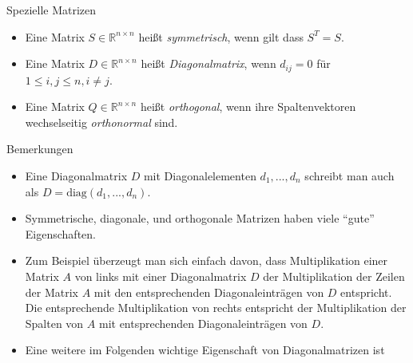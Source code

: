 \documentclass[
  8pt,
  ignorenonframetext,
]{beamer}
\begin{document}
\begin{frame}{Spezielle Matrizen}
\protect\hypertarget{spezielle-matrizen-1}{}
\footnotesize
\begin{definition}
\begin{itemize}
\item Eine Matrix $S \in \mathbb{R}^{n \times n}$ heißt \textit{symmetrisch}, wenn gilt dass $S^T = S$.
\item Eine Matrix $D \in \mathbb{R}^{n \times n}$ heißt \textit{Diagonalmatrix}, wenn $d_{ij} = 0$ für $1 \le i,j \le n, i \neq j$.
\item Eine Matrix $Q \in \mathbb{R}^{n \times n}$ heißt \textit{orthogonal}, wenn ihre Spaltenvektoren wechselseitig \textit{orthonormal} sind.
\end{itemize}
\end{definition}

Bemerkungen

\begin{itemize}
\justifying
\item Eine Diagonalmatrix $D$ mit Diagonalelementen $d_1,...,d_n$ schreibt man auch als $ D= \mbox{diag}(d_1,...,d_n)$.
\item Symmetrische, diagonale, und orthogonale Matrizen haben viele ``gute'' Eigenschaften.
\item Zum Beispiel überzeugt man sich einfach davon, dass Multiplikation einer Matrix $A$ 
von links mit einer Diagonalmatrix $D$ der Multiplikation der Zeilen der Matrix $A$ 
mit den entsprechenden Diagonaleinträgen von $D$ entspricht. Die entsprechende 
Multiplikation von rechts entspricht der Multiplikation der Spalten von $A$ mit 
entsprechenden Diagonaleinträgen von $D$.
\item Eine weitere im Folgenden wichtige Eigenschaft von Diagonalmatrizen ist
\begin{itemize}
\end{itemize}
\end{itemize}
\end{frame}
\end{document}
